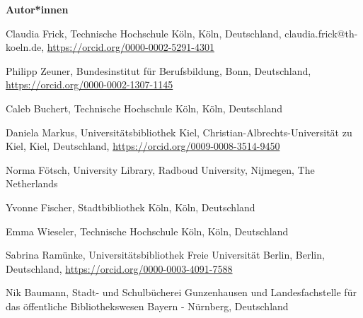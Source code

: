 \documentclass[a4paper,
fontsize=11pt,
oneside,
numbers=noperiodatend,
parskip=half-,
bibliography=totoc,
final
]{scrartcl}
\begin{document}
\textbf{Autor*innen}

Claudia Frick, Technische Hochschule Köln, Köln, Deutschland, claudia.frick@th-koeln.de, \url{https://orcid.org/0000-0002-5291-4301}

Philipp Zeuner, Bundesinstitut für Berufsbildung, Bonn, Deutschland, \url{https://orcid.org/0000-0002-1307-1145}

Caleb Buchert, Technische Hochschule Köln, Köln, Deutschland

Daniela Markus, Universitätsbibliothek Kiel, Christian-Albrechts-Universität zu Kiel, Kiel, Deutschland, \url{https://orcid.org/0009-0008-3514-9450}

Norma Fötsch, University Library, Radboud University, Nijmegen, The Netherlands

Yvonne Fischer, Stadtbibliothek Köln, Köln, Deutschland

Emma Wieseler, Technische Hochschule Köln, Köln, Deutschland

Sabrina Ramünke, Universitätsbibliothek Freie Universität Berlin, Berlin, Deutschland, \url{https://orcid.org/0000-0003-4091-7588}

Nik Baumann, Stadt- und Schulbücherei Gunzenhausen und Landesfachstelle für das öffentliche Bibliothekswesen Bayern - Nürnberg, Deutschland
\end{document}
